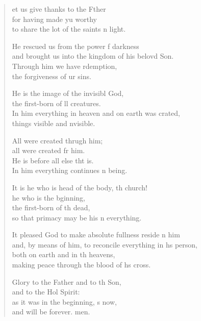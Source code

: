 \begin{verse}
  \begin{patverse}
et us give thanks to the Fther\Flex\\
for having made yu worthy\Med\\
to share the lot of the saints \pointup{\i}n light.

He rescued us from the power f darkness\Med\\
and brought us into the kingdom of his belovd Son.\\
Through him we have rdemption,\Med\\
the forgiveness of ur sins.

He is the image of the invisibl God,\Med\\
the first-born of ll creatures.\\
In him everything in heaven and on earth was crated,\Med\\
things visible and \pointup{\i}nvisible.

All were created thrugh him;\Med\\
all were created fr him.\\
He is before all else tht is.\Med\\
In him everything continues \pointup{\i}n being.

It is he who is head of the body, th church!\Med\\
he who is the bginning,\\
the first-born of th dead,\Med\\
so that primacy may be his \pointup{\i}n everything.

It pleased God to make absolute fullness reside \pointup{\i}n him\Med\\
and, by means of him, to reconcile everything in h\pointup{\i}s person,\\
both on earth and in th heavens,\Med\\
making peace through the blood of h\pointup{\i}s cross.

Glory to the Father and to th Son,\Med\\
and to the Hol Spirit:\\
as it was in the beginning, \pointup{\i}s now,\Med\\
and will be forever. men. 
  \end{patverse}
\end{verse}
